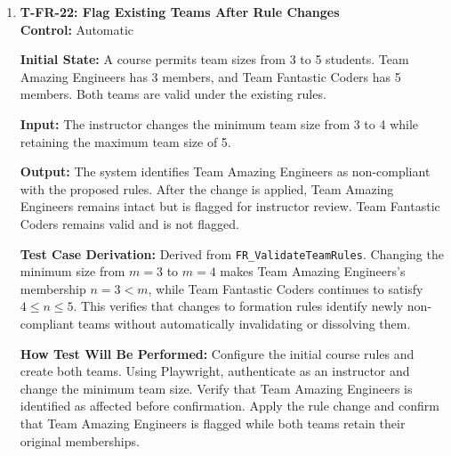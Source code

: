 \documentclass[12pt, titlepage]{article}
\begin{document}
\begin{enumerate}
\textbf{Input:} Student A attempts to join Team Fantastic Coders while remaining a member of Team Amazing Engineers.

\textbf{Output:} The system rejects Student A's attempt to join Team Fantastic Coders. Student A remains a member of Team Amazing Engineers only, and neither team's membership is incorrectly modified.

\textbf{Test Case Derivation:} Derived from \texttt{FR\_ValidateTeamRules}. Attempting to join a second team verifies that duplicate membership is prevented and that a student belongs to at most one team.

\textbf{How Test Will Be Performed:} Configure the two teams and their membership records. Using Playwright, authenticate as Student A and attempt to join Team Fantastic Coders. Verify the rejection and confirm that Student A remains associated only with Team Amazing Engineers.

\item \label{T-FR-22}\textbf{T-FR-22: Flag Existing Teams After Rule Changes}\\

\textbf{Control:} Automatic

\textbf{Initial State:} A course permits team sizes from 3 to 5 students. Team Amazing Engineers has 3 members, and Team Fantastic Coders has 5 members. Both teams are valid under the existing rules.

\textbf{Input:} The instructor changes the minimum team size from 3 to 4 while retaining the maximum team size of 5.

\textbf{Output:} The system identifies Team Amazing Engineers as non-compliant with the proposed rules. After the change is applied, Team Amazing Engineers remains intact but is flagged for instructor review. Team Fantastic Coders remains valid and is not flagged.

\textbf{Test Case Derivation:} Derived from \texttt{FR\_ValidateTeamRules}. Changing the minimum size from $m = 3$ to $m = 4$ makes Team Amazing Engineers's membership $n = 3 < m$, while Team Fantastic Coders continues to satisfy $4 \leq n \leq 5$. This verifies that changes to formation rules identify newly non-compliant teams without automatically invalidating or dissolving them.

\textbf{How Test Will Be Performed:} Configure the initial course rules and create both teams. Using Playwright, authenticate as an instructor and change the minimum team size. Verify that Team Amazing Engineers is identified as affected before confirmation. Apply the rule change and confirm that Team Amazing Engineers is flagged while both teams retain their original memberships.


\end{enumerate}
\end{document}
